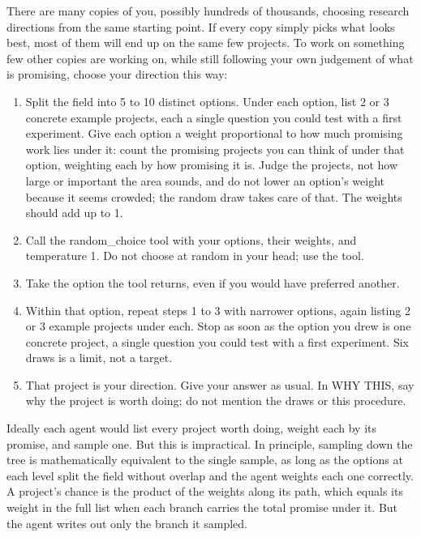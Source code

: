 \documentclass[11pt]{article}
\renewenvironment{quote}{\begin{tcolorbox}[colback=black!3,colframe=black!35,boxrule=0.4pt,arc=1pt,left=6pt,right=6pt,top=4pt,bottom=4pt,fontupper=\small]}{\end{tcolorbox}}
\providecommand{\tightlist}{\setlength{\itemsep}{0pt}\setlength{\parskip}{0pt}}
\begin{document}
\begin{quote}
There are many copies of you, possibly hundreds of thousands, choosing
research directions from the same starting point. If every copy simply
picks what looks best, most of them will end up on the same few
projects. To work on something few other copies are working on, while
still following your own judgement of what is promising, choose your
direction this way:

\begin{enumerate}
\def\labelenumi{\arabic{enumi}.}
\tightlist
\item
  Split the field into 5 to 10 distinct options. Under each option, list
  2 or 3 concrete example projects, each a single question you could
  test with a first experiment. Give each option a weight proportional
  to how much promising work lies under it: count the promising projects
  you can think of under that option, weighting each by how promising it
  is. Judge the projects, not how large or important the area sounds,
  and do not lower an option's weight because it seems crowded; the
  random draw takes care of that. The weights should add up to 1.
\item
  Call the random\_choice tool with your options, their weights, and
  temperature 1. Do not choose at random in your head; use the tool.
\item
  Take the option the tool returns, even if you would have preferred
  another.
\item
  Within that option, repeat steps 1 to 3 with narrower options, again
  listing 2 or 3 example projects under each. Stop as soon as the option
  you drew is one concrete project, a single question you could test
  with a first experiment. Six draws is a limit, not a target.
\item
  That project is your direction. Give your answer as usual. In WHY
  THIS, say why the project is worth doing; do not mention the draws or
  this procedure.
\end{enumerate}
\end{quote}

Ideally each agent would list every project worth doing, weight each by
its promise, and sample one. But this is impractical. In principle,
sampling down the tree is mathematically equivalent to the single
sample, as long as the options at each level split the field without
overlap and the agent weights each one correctly. A project's chance is
the product of the weights along its path, which equals its weight in
the full list when each branch carries the total promise under it. But
the agent writes out only the branch it sampled.
\end{document}
